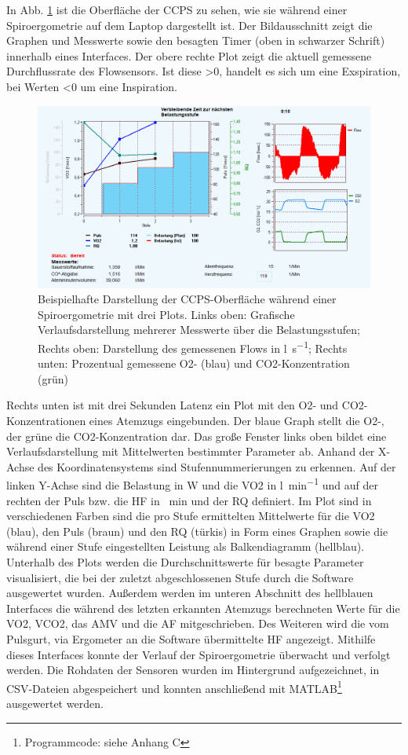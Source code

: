 In Abb. \ref{pic:pic12} ist die Oberfläche der \gls{CCPS} zu sehen, wie sie während einer Spiroergometrie auf dem Laptop dargestellt ist. Der Bildausschnitt zeigt die Graphen und Messwerte sowie den besagten Timer (oben in schwarzer Schrift) innerhalb eines Interfaces. Der obere rechte Plot zeigt die aktuell gemessene Durchflussrate des Flowsensors. Ist diese >0, handelt es sich um eine Exspiration, bei Werten <0 um eine Inspiration.
%
\begin{figure}[H]
	\centering
	\includegraphics[width=\textwidth]{Bilder/sw_screen.png}
	\caption[Beispielhafte Software-Oberfläche während einer Spiroergometrie]{Beispielhafte Darstellung der \gls{CCPS}-Oberfläche während einer Spiroergometrie mit drei Plots. Links oben: Grafische Verlaufsdarstellung mehrerer Messwerte über die Belastungsstufen; Rechts oben: Darstellung des gemessenen Flows in \si{\litre\per\second}; Rechts unten: Prozentual gemessene \gls{O2}- (blau) und \gls{CO2}-Konzentration (grün)}
	\label{pic:pic12}
\end{figure}
%
Rechts unten ist mit drei Sekunden Latenz ein Plot mit den \gls{O2}- und \gls{CO2}-Konzentrationen eines Atemzugs eingebunden. Der blaue Graph stellt die \gls{O2}-, der grüne die \gls{CO2}-Konzentration dar. Das große Fenster links oben bildet eine Verlaufsdarstellung mit Mittelwerten bestimmter Parameter ab. Anhand der X-Achse des Koordinatensystems sind Stufennummerierungen zu erkennen. Auf der linken Y-Achse sind die Belastung in \si{\watt} und die \gls{VO2} in \si{\litre\per\minute} und auf der rechten der Puls bzw. die \gls{HF} in \si{\per\minute} und der \gls{RQ} definiert. Im Plot sind in verschiedenen Farben sind die pro Stufe ermittelten Mittelwerte für die \gls{VO2} (blau), den Puls (braun) und den \gls{RQ} (türkis) in Form eines Graphen sowie die während einer Stufe eingestellten Leistung als Balkendiagramm (hellblau). Unterhalb des Plots werden die Durchschnittswerte für besagte Parameter visualisiert, die bei der zuletzt abgeschlossenen Stufe durch die Software ausgewertet wurden. Außerdem werden im unteren Abschnitt des hellblauen Interfaces die während des letzten erkannten Atemzugs berechneten Werte für die \gls{VO2}, \gls{VCO2}, das \gls{AMV} und die \gls{AF} mitgeschrieben. Des Weiteren wird die vom Pulsgurt, via Ergometer an die Software übermittelte \gls{HF} angezeigt. Mithilfe dieses Interfaces konnte der Verlauf der Spiroergometrie überwacht und verfolgt werden. Die Rohdaten der Sensoren wurden im Hintergrund aufgezeichnet, in \acrshort{CSV}-Dateien abgespeichert und konnten anschließend mit MATLAB\footnote{Programmcode: siehe Anhang C} ausgewertet werden.
%
